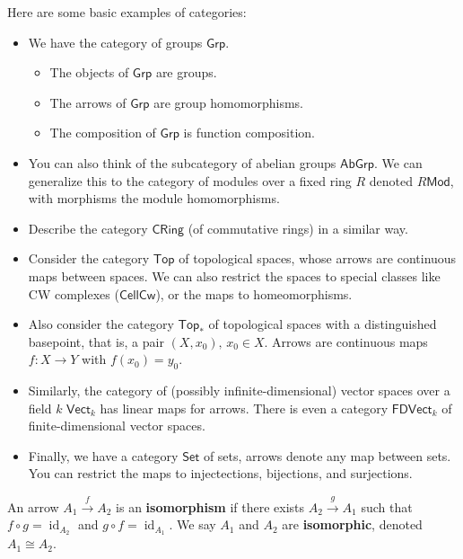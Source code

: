 \begin{example}
    Here are some basic examples of categories:
    \begin{itemize}
        \item We have the category of groups $\mathsf{Grp}.$ 
            \begin{itemize}
                \item The objects of $\mathsf{Grp}$ are groups.
                \item The arrows of $\mathsf{Grp}$ are group homomorphisms.
                \item The composition of $\mathsf{Grp}$ is function composition.
            \end{itemize}
        \item You can also think of the subcategory of abelian groups $\mathsf{AbGrp} $. We can generalize this to the category of modules over a fixed ring $R$ denoted $R\mathsf{Mod} $, with morphisms the module homomorphisms.
        \item Describe the category $\mathsf{CRing}$ (of commutative rings) in a similar way.
        \item Consider the category $\mathsf{Top}$ of topological spaces, whose arrows are continuous maps between spaces. We can also restrict the spaces to special classes like CW complexes ($\mathsf{CellCw} $), or the maps to homeomorphisms.
        \item Also consider the category $\mathsf{Top}_{*}$ of topological spaces with a distinguished basepoint, that is, a pair $(X,x_0), \, x_0\in X$. Arrows are continuous maps $f \colon X \to Y$ with $f(x_0)=y_0$.
        \item Similarly, the category of (possibly infinite-dimensional) vector spaces over a field $k$ $\mathsf{Vect}_{k}$ has linear maps for arrows. There is even a category $\mathsf{FDVect}_{k}$ of finite-dimensional vector spaces.
        \item Finally, we have a category $\mathsf{Set}$ of sets, arrows denote any map between sets. You can restrict the maps to injectections, bijections, and surjections.
    \end{itemize}
\end{example}
\begin{definition}[Isomorphism]
    An arrow $A_1\overset{f}{\to }A_2$ is an \textbf{isomorphism} if there exists $A_2\overset{g}{\to }A_1$ such that $f\circ g=\operatorname{id}_{A_2}$ and $g\circ f=\operatorname{id}_{A_1}$. We say $A_1$ and $A_2$ are \textbf{isomorphic}, denoted $A_1\cong A_2$.
\end{definition}
